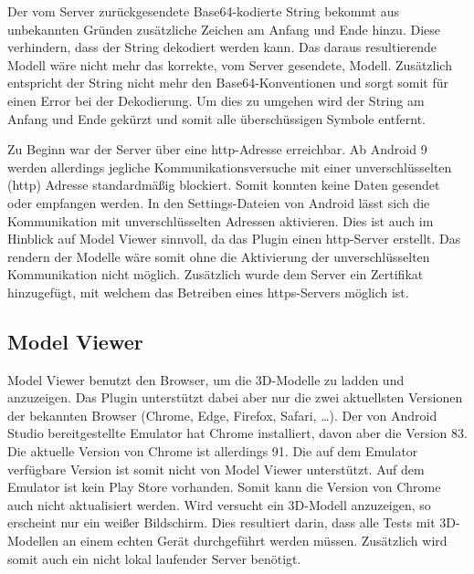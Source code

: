 Der vom Server zurückgesendete Base64-kodierte String bekommt aus unbekannten Gründen zusätzliche Zeichen am Anfang und Ende hinzu. Diese verhindern, dass der String dekodiert 
werden kann. Das daraus resultierende Modell wäre nicht mehr das korrekte, vom Server gesendete, Modell. Zusätzlich entspricht der String nicht mehr den Base64-Konventionen und 
sorgt somit für einen Error bei der Dekodierung. \newline
Um dies zu umgehen wird der String am Anfang und Ende gekürzt und somit alle überschüssigen Symbole entfernt.

Zu Beginn war der Server über eine http-Adresse erreichbar. Ab Android 9 werden allerdings jegliche Kommunikationsversuche mit einer unverschlüsselten (http) Adresse standardmäßig 
blockiert. Somit konnten keine Daten gesendet oder empfangen werden. \newline
In den Settings-Dateien von Android lässt sich die Kommunikation mit unverschlüsselten Adressen aktivieren. Dies ist auch im Hinblick auf Model Viewer sinnvoll, da das Plugin einen 
http-Server erstellt. Das rendern der Modelle wäre somit ohne die Aktivierung der unverschlüsselten Kommunikation nicht möglich. \newline
Zusätzlich wurde dem Server ein Zertifikat hinzugefügt, mit welchem das Betreiben eines https-Servers möglich ist.

\subsection{Model Viewer}

Model Viewer benutzt den Browser, um die 3D-Modelle zu ladden und anzuzeigen. Das Plugin unterstützt dabei aber nur die zwei aktuellsten Versionen der bekannten Browser 
(Chrome, Edge, Firefox, Safari, \dots). Der von Android Studio bereitgestellte Emulator hat Chrome installiert, davon aber die Version 83. Die aktuelle Version von Chrome ist allerdings 
91. Die auf dem Emulator verfügbare Version ist somit nicht von Model Viewer unterstützt. Auf dem Emulator ist kein Play Store vorhanden. Somit kann die Version von Chrome auch nicht 
aktualisiert werden. Wird versucht ein 3D-Modell anzuzeigen, so erscheint nur ein weißer Bildschirm. \newline
Dies resultiert darin, dass alle Tests mit 3D-Modellen an einem echten Gerät durchgeführt werden müssen. Zusätzlich wird somit auch ein nicht lokal laufender Server benötigt.